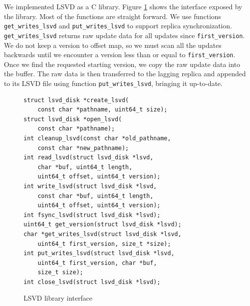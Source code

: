 We implemented LSVD as a C library. Figure \ref{fig:lsvdinterface} shows the interface exposed by the library. Most of the functions are straight forward. We use functions \texttt{get\_writes\_lsvd} and \texttt{put\_writes\_lsvd} to support replica synchronization. \texttt{get\_writes\_lsvd} returns raw update data for all updates since \texttt{first\_version}. We do not keep a version to offset map, so we must scan all the updates backwards until we encounter a version less than or equal to \texttt{first\_version}. Once we find the requested starting version, we copy the raw update data into the buffer. The raw data is then transferred to the lagging replica and appended to its LSVD file using function \texttt{put\_writes\_lsvd}, bringing it up-to-date.

\lstset{language=C}
\lstset{basicstyle=\small}
\lstset{frame=tlrb}
\begin{figure}
\begin{lstlisting}
struct lsvd_disk *create_lsvd(
	const char *pathname, uint64_t size);
struct lsvd_disk *open_lsvd(
	const char *pathname);
int cleanup_lsvd(const char *old_pathname, 
	const char *new_pathname);
int read_lsvd(struct lsvd_disk *lsvd,
	char *buf, uint64_t length,
	uint64_t offset, uint64_t version);
int write_lsvd(struct lsvd_disk *lsvd,
	const char *buf, uint64_t length, 
	uint64_t offset, uint64_t version);
int fsync_lsvd(struct lsvd_disk *lsvd);
uint64_t get_version(struct lsvd_disk *lsvd);
char *get_writes_lsvd(struct lsvd_disk *lsvd, 
	uint64_t first_version, size_t *size);
int put_writes_lsvd(struct lsvd_disk *lsvd, 
	uint64_t first_version, char *buf,
	size_t size);
int close_lsvd(struct lsvd_disk *lsvd);
\end{lstlisting}
\caption{LSVD library interface}
\label{fig:lsvdinterface}
\end{figure}
